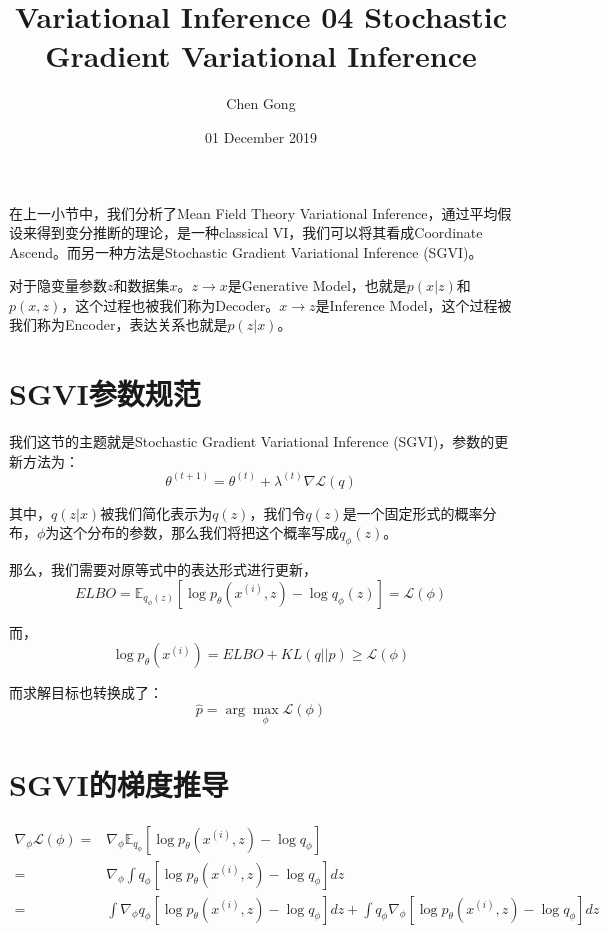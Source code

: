 \documentclass[a4paper]{article}
\title{Variational Inference 04 Stochastic Gradient Variational Inference}
\author{Chen Gong}
\date{01 December 2019}
\begin{document}
\maketitle
在上一小节中，我们分析了Mean Field Theory Variational Inference，通过平均假设来得到变分推断的理论，是一种classical VI，我们可以将其看成Coordinate Ascend。而另一种方法是Stochastic Gradient Variational Inference (SGVI)。

对于隐变量参数$z$和数据集$x$。$z \longrightarrow x$是Generative Model，也就是$p(x|z)$和$p(x,z)$，这个过程也被我们称为Decoder。$x \longrightarrow z$是Inference Model，这个过程被我们称为Encoder，表达关系也就是$p(z|x)$。

\section{SGVI参数规范}
我们这节的主题就是Stochastic Gradient Variational Inference (SGVI)，参数的更新方法为：
\begin{equation}
    \theta^{(t+1)} = \theta^{(t)} + \lambda^{(t)}\nabla \mathcal{L}(q)
\end{equation}

其中，$q(z|x)$被我们简化表示为$q(z)$，我们令$q(z)$是一个固定形式的概率分布，$\phi$为这个分布的参数，那么我们将把这个概率写成$q_{\phi}(z)$。

那么，我们需要对原等式中的表达形式进行更新，
\begin{equation}
    ELBO = \mathbb{E}_{q_{\phi}(z)}\left[ \log p_{\theta}(x^{(i)},z) - \log q_{\phi}(z) \right] = \mathcal{L}(\phi)
\end{equation}

而，
\begin{equation}
    \log p_{\theta}(x^{(i)}) = ELBO + KL(q||p) \geq \mathcal{L}(\phi)
\end{equation}

而求解目标也转换成了：
\begin{equation}
    \hat{p} = \arg\max_{\phi} \mathcal{L}(\phi)
\end{equation}

\section{SGVI的梯度推导}
\begin{equation}
    \begin{split}
        \nabla_{\phi} \mathcal{L}(\phi)
        = & \nabla_{\phi} \mathbb{E}_{q_{\phi}}\left[ \log p_{\theta}(x^{(i)},z) - \log q_{\phi} \right] \\
        = & \nabla_{\phi} \int q_{\phi}\left[ \log p_{\theta}(x^{(i)},z) - \log q_{\phi} \right]dz \\
         = &  \int \nabla_{\phi} q_{\phi}\left[ \log p_{\theta}(x^{(i)},z) - \log q_{\phi} \right]dz + 
         \int q_{\phi}\nabla_{\phi} \left[ \log p_{\theta}(x^{(i)},z) - \log q_{\phi} \right]dz \\
    \end{split}
\end{equation}
\end{document}
